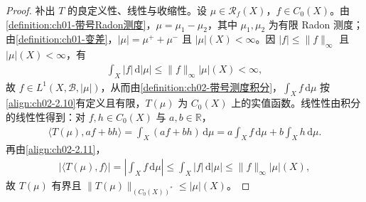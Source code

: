 \documentclass[../../main.tex]{subfiles}%
\begin{document}
\begin{proof}
补出 $T$ 的良定义性、线性与收缩性。设 $\mu\in\mathscr R_f(X)$，$f\in C_0(X)$。由\cref{definition:ch01-带号Radon测度}，$\mu=\mu_1-\mu_2$，其中 $\mu_1,\mu_2$ 为有限 Radon 测度；由\cref{definition:ch01-变差}，$|\mu|=\mu^++\mu^-$ 且 $|\mu|(X)<\infty$。因 $|f|\leqslant\|f\|_\infty$ 且 $|\mu|(X)<\infty$，有
\begin{align*}
\int_X|f|\,\mathrm{d}|\mu|\leqslant\|f\|_\infty|\mu|(X)<\infty,
\end{align*}
故 $f\in L^1(X,\mathscr B,|\mu|)$，从而由\cref{definition:ch02-带号测度积分}，$\int_Xf\,\mathrm{d}\mu$ 按\eqref{align:ch02-2.10}有定义且有限，$T(\mu)$ 为 $C_0(X)$ 上的实值函数。线性性由积分的线性性得到：对 $f,h\in C_0(X)$ 与 $a,b\in\mathbb R$，
\begin{align*}
\langle T(\mu),af+bh\rangle=\int_X(af+bh)\,\mathrm{d}\mu=a\int_Xf\,\mathrm{d}\mu+b\int_Xh\,\mathrm{d}\mu.
\end{align*}
再由\eqref{align:ch02-2.11}，
\begin{align*}
|\langle T(\mu),f\rangle|=\left|\int_Xf\,\mathrm{d}\mu\right|\leqslant\int_X|f|\,\mathrm{d}|\mu|\leqslant\|f\|_\infty|\mu|(X),
\end{align*}
故 $T(\mu)$ 有界且 $\|T(\mu)\|_{(C_0(X))^*}\leqslant|\mu|(X)$。
\end{proof}
\end{document}
